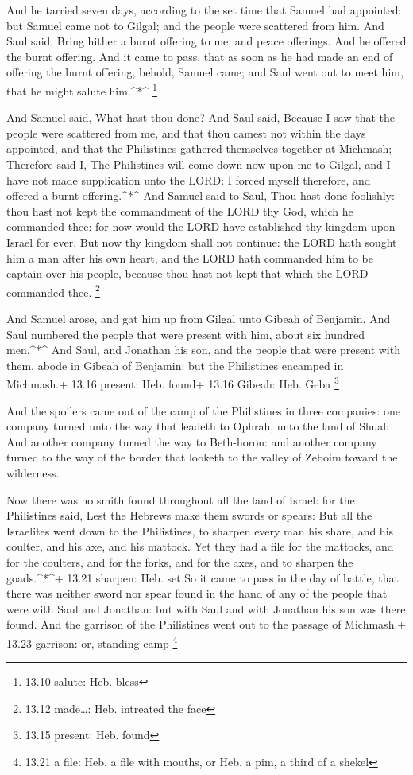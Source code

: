  And he tarried seven days, according to the set time that
Samuel had appointed: but Samuel came not to Gilgal; and the people were
scattered from him.  And Saul said, Bring hither a burnt
offering to me, and peace offerings. And he offered the burnt offering.
 And it came to pass, that as soon as he had made an end of
offering the burnt offering, behold, Samuel came; and Saul went out to
meet him, that he might salute him.\^{}*\^{} \footnote{13.10 salute:
  Heb. bless}

 And Samuel said, What hast thou done? And Saul said,
Because I saw that the people were scattered from me, and that thou
camest not within the days appointed, and that the Philistines gathered
themselves together at Michmash;  Therefore said I, The
Philistines will come down now upon me to Gilgal, and I have not made
supplication unto the LORD: I forced myself therefore, and offered a
burnt offering.\^{}*\^{}  And Samuel said to Saul, Thou
hast done foolishly: thou hast not kept the commandment of the LORD thy
God, which he commanded thee: for now would the LORD have established
thy kingdom upon Israel for ever.  But now thy kingdom
shall not continue: the LORD hath sought him a man after his own heart,
and the LORD hath commanded him to be captain over his people, because
thou hast not kept that which the LORD commanded thee. \footnote{13.12
  made\ldots: Heb. intreated the face}

 And Samuel arose, and gat him up from Gilgal unto Gibeah
of Benjamin. And Saul numbered the people that were present with him,
about six hundred men.\^{}*\^{}  And Saul, and Jonathan his
son, and the people that were present with them, abode in Gibeah of
Benjamin: but the Philistines encamped in Michmash.+ 13.16 present: Heb.
found+ 13.16 Gibeah: Heb. Geba \footnote{13.15 present: Heb. found}

 And the spoilers came out of the camp of the Philistines
in three companies: one company turned unto the way that leadeth to
Ophrah, unto the land of Shual:  And another company turned
the way to Beth-horon: and another company turned to the way of the
border that looketh to the valley of Zeboim toward the wilderness.

 Now there was no smith found throughout all the land of
Israel: for the Philistines said, Lest the Hebrews make them swords or
spears:  But all the Israelites went down to the
Philistines, to sharpen every man his share, and his coulter, and his
axe, and his mattock.  Yet they had a file for the
mattocks, and for the coulters, and for the forks, and for the axes, and
to sharpen the goads.\^{}*\^{}+ 13.21 sharpen: Heb. set  So
it came to pass in the day of battle, that there was neither sword nor
spear found in the hand of any of the people that were with Saul and
Jonathan: but with Saul and with Jonathan his son was there found.
 And the garrison of the Philistines went out to the
passage of Michmash.+ 13.23 garrison: or, standing camp \footnote{13.21
  a file: Heb. a file with mouths, or Heb. a pim, a third of a shekel}

